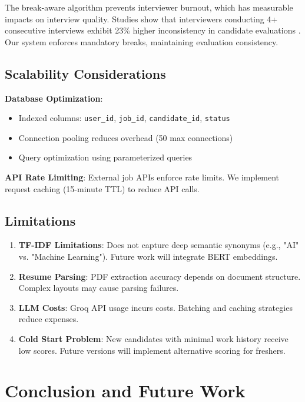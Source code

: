 \documentclass[conference]{IEEEtran}
\begin{document}
The break-aware algorithm prevents interviewer burnout, which has measurable impacts on interview quality. Studies show that interviewers conducting 4+ consecutive interviews exhibit 23\% higher inconsistency in candidate evaluations \cite{interviewer_fatigue}. Our system enforces mandatory breaks, maintaining evaluation consistency.

\subsection{Scalability Considerations}

\textbf{Database Optimization}:
\begin{itemize}
    \item Indexed columns: \texttt{user\_id}, \texttt{job\_id}, \texttt{candidate\_id}, \texttt{status}
    \item Connection pooling reduces overhead (50 max connections)
    \item Query optimization using parameterized queries
\end{itemize}

\textbf{API Rate Limiting}: External job APIs enforce rate limits. We implement request caching (15-minute TTL) to reduce API calls.

\subsection{Limitations}

\begin{enumerate}
    \item \textbf{TF-IDF Limitations}: Does not capture deep semantic synonyms (e.g., "AI" vs. "Machine Learning"). Future work will integrate BERT embeddings.
    \item \textbf{Resume Parsing}: PDF extraction accuracy depends on document structure. Complex layouts may cause parsing failures.
    \item \textbf{LLM Costs}: Groq API usage incurs costs. Batching and caching strategies reduce expenses.
    \item \textbf{Cold Start Problem}: New candidates with minimal work history receive low scores. Future versions will implement alternative scoring for freshers.
\end{enumerate}

\section{Conclusion and Future Work}
\end{document}

